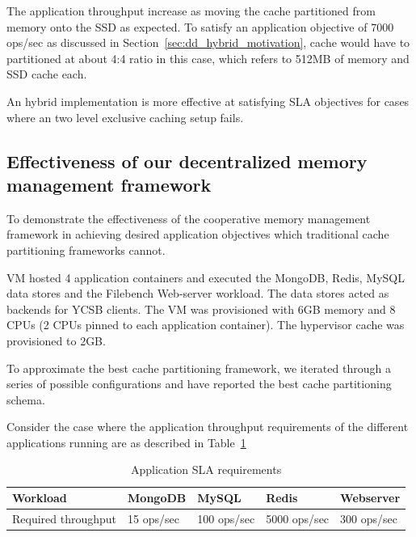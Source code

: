 	The application throughput increase as moving the cache partitioned from memory onto the SSD as expected.
	To satisfy an application objective of 7000 ops/sec as discussed in Section~\ref{sec:dd_hybrid_motivation}, 
	cache would have to partitioned at about 4:4 ratio in this case, which refers to 512MB of memory and SSD 
	cache each.
	
	An hybrid implementation is more effective at satisfying SLA objectives for cases where an two level exclusive
	caching setup fails.
	
    \subsection{Effectiveness of our decentralized memory management framework}
      
	To demonstrate the effectiveness of the cooperative memory management framework in achieving desired application 
	objectives which traditional cache partitioning frameworks cannot.
	
	VM hosted 4 application containers and executed the MongoDB, Redis, MySQL data stores and
	the Filebench Web-server workload. The data stores acted as backends for YCSB clients. The VM 
	was provisioned with 6GB memory and 8 CPUs (2 CPUs pinned to each application container). 
	The hypervisor cache was provisioned to 2GB.
	
	To approximate the best cache partitioning framework, we iterated through a series of possible 
	configurations and have reported the best cache partitioning schema. 
	
	Consider the case where the application throughput requirements of the different applications running
	are as described in Table~\ref{table:desired_app_throughputs}
	
	    \begin{table}
		\begin{center}
		  \begin{tabular}{ l | l | l | l | l }	      	    
			Workload & MongoDB & MySQL & Redis & Webserver \\ 
		    \hline
			Required throughput & 15 ops/sec & 100 ops/sec & 5000 ops/sec & 300 ops/sec \\		   
		  \end{tabular}
		\caption{Application SLA requirements}
		\label{table:desired_app_throughputs}
		\end{center}	  
	      \end{table}
	  
